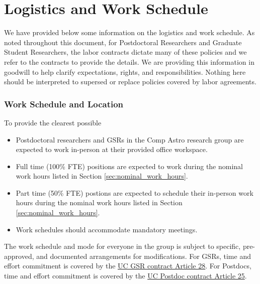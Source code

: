 \section{Logistics and Work Schedule}
\label{sec:logistics}

We have provided below some information on the logistics and work schedule. As noted throughout this document, for Postdoctoral Researchers and Graduate Student Researchers, the labor contracts dictate many of these policies and we refer to the contracts to provide the details. We are providing this information in goodwill to help
clarify expectations, rights, and responsibilities. Nothing here should be interpreted to supersed or replace
policies covered by labor agreements.


\subsubsection{Work Schedule and Location}

To provide the clearest possible

\begin{itemize}
	\item Postdoctoral researchers and GSRs in the Comp Astro research group are expected to work in-person at their provided office workspace.
	\item Full time (100\% FTE) positions are expected to work during the nominal work hours listed in Section \ref{sec:nominal_work_hours}.
	\item Part time (50\% FTE) postions are expected to schedule their in-person work hours during the nominal work hours listed in Section \ref{sec:nominal_work_hours}.
	\item Work schedules should accommodate mandatory meetings.
\end{itemize}

\noindent
The work schedule and mode for everyone in the group is subject to specific, pre-approved, and documented arrangements for modifications. For GSRs, time and effort commitment is covered by the \href{https://qa.ucnet.universityofcalifornia.edu/labor/bargaining-units/br/docs/br_28_time-and-effort-commitment_2022-2025.pdf}{UC GSR contract Article 28}. For Postdocs, time
and effort commitment is covered by the \href{https://ucnet.universityofcalifornia.edu/wp-content/uploads/labor/bargaining-units/px/docs/px_tentative_agremeents_effective_12-09-2022.pdf}{UC Postdoc contract Article 25}.

